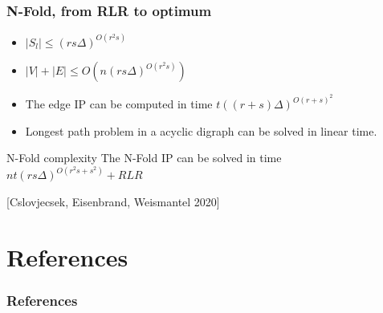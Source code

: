 \documentclass{beamer}
\begin{document}




    
    
    \begin{frame}
        \frametitle{N-Fold, from RLR to optimum}
        \begin{itemize}
            \item $|S_l| \leq (rs\Delta)^{O(r^2s)}$
            \item $|V| + |E| \leq O(n(rs\Delta)^{O(r^2s)})$
            \item The edge IP can be computed in time $t((r + s)\Delta)^{O(r + s)^2}$
            \item Longest path problem in a acyclic digraph can be solved in linear time.
        \end{itemize}
        \vspace{1cm}
        \begin{block}{N-Fold complexity}
            The N-Fold IP can be solved in time $nt(rs\Delta)^{O(r^2s + s^2)} + RLR$
        \end{block}
        [Cslovjecsek, Eisenbrand, Weismantel 2020]
    \end{frame}
    
    \section{References}
    \begin{frame}[allowframebreaks] %
        \frametitle{References}
        \nocite{*}
        \printbibliography
    \end{frame}
\end{document}
